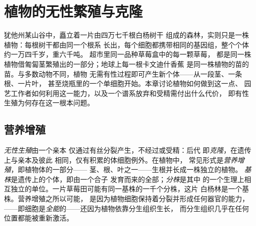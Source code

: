 \chapter{植物的无性繁殖与克隆}\label{ch:b2:asexual-reproduction}

犹他州某山谷中，矗立着一片由四万七千根白杨树干
组成的森林，实则只是一株植物：每根树干都由同一个根系
长出，每个细胞都携带相同的基因组，整个个体
约一万四千岁，重六千吨。
超市里同一品种草莓盒中的每一颗草莓，
都是同一株植物借匍匐茎繁殖出的一部分；地球上每一根卡文迪什香蕉
是同一株植物的苗的苗。与多数动物不同，植物
无需有性过程即可产生新个体——从一段茎、一条根、一片叶，
甚至烧瓶里的一个单细胞开始。本章讨论植物如何做到这一点、
园艺工作者如何利用这一能力，以及一个谱系放弃和受精需付出什么代价，
即有性生殖为何存在这一根本问题。

\section{营养增殖}

\begin{definition}[克隆、基株、分株]\label{def:b2:asexual-reproduction:clone}
\emph{无性生殖}由一个亲本
仅通过有丝分裂产生，不经过或受精：后代
即\emph{克隆}，在遗传上与亲本及彼此
相同，仅有积累的体细胞例外。在植物中，
常见形式是\emph{营养增殖}，即植物体的一部分——
茎、根、叶之一——生根并长成一株独立的植物。
\emph{基株}是遗传上的个体，即由一个合子
发育而来的全部；\emph{分株}是其中
的一个生理上相互独立的单位。一片草莓田可能有同一基株的一千个分株，这片
白杨林是一个基株。营养增殖之所以可能，
是因为植物细胞保持着分裂并形成任何器官的能力，
——即细胞是\emph{全能}的——还因为植物依靠分生组织生长，
而分生组织几乎在任何位置都能被重新激活。
\end{definition}

